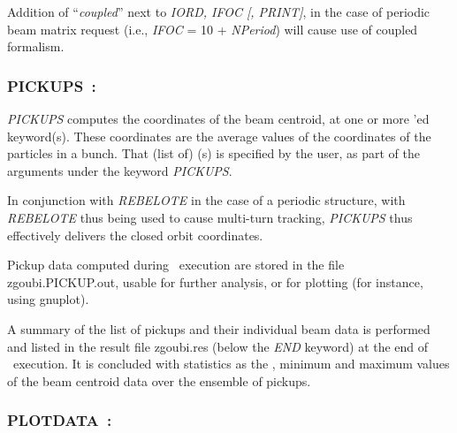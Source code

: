 \medskip

\noindent  Addition of ``\textsl{coupled}'' next to \textsl{IORD, IFOC [, PRINT]}, in the case of 
periodic beam matrix request (i.e., \textsl{IFOC} = 10  +  \textsl{NPeriod}) will cause use of coupled formalism. 




\newpage

 
\subsubsection*{PICKUPS~: \PICKUPSTitl}\label{PICKUPS} 
\medskip

\noindent \textsl{PICKUPS} computes the coordinates of the beam centroid, 
at one or more \LABEL'ed keyword(s). 
 These coordinates are the average values of the coordinates of the  particles in a bunch. 
That (list of) \LABEL(s) is specified by the user, as part of the arguments under the keyword  \textsl{PICKUPS}.

\medskip

\noindent In conjunction with \textsl{REBELOTE} in the case of a periodic structure, 
with  \textsl{REBELOTE} thus being used to cause multi-turn tracking, 
  \textsl{PICKUPS} thus effectively delivers the closed orbit coordinates.        

\medskip

\noindent Pickup data computed during \zgou\ execution are stored in the file zgoubi.PICKUP.out, 
usable for further analysis, or for plotting (for instance, using gnuplot). 

\medskip

\noindent A summary of the list of pickups and their individual beam data is performed  and listed 
in the result file zgoubi.res  (below the   \textsl{END}   keyword) 
at the end of \zgou\ execution. It is concluded with statistics as the \rms, minimum and maximum values 
of the beam centroid data over the ensemble of pickups. 




\newpage


\subsubsection*{PLOTDATA~: \PLOTDATATitl~\protect\cite{BiblioPlot}} \label{PLOTDATA} 

\medskip

